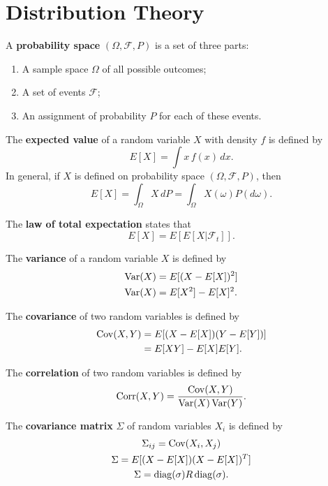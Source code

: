\section{Distribution Theory}

\begin{outline}
\1 A \textbf{probability space} $(\Omega, \mathscr{F}, P)$ is a set of three parts:
\begin{enumerate}
\item A sample space $\Omega$ of all possible outcomes;
\item A set of events $\mathscr{F}$;
\item An assignment of probability $P$ for each of these events.
\end{enumerate}

\1 The \textbf{expected value} of a random variable $X$ with density $f$ is defined by
\begin{equation*}
  E[X] = \int x\,f(x)\,dx.
\end{equation*}
In general, if $X$ is defined on probability space $(\Omega,\mathscr{F},P)$, then 
\begin{equation*}
  E[X] = \int_\Omega X\,dP = \int_\Omega X(\omega)P(d\omega).
\end{equation*}

\1 The \textbf{law of total expectation} states that
\begin{equation*}
  E[X] = E[E[X|\mathscr{F}_t]].
\end{equation*}

\1 The \textbf{variance} of a random variable $X$ is defined by
\begin{align*}
  \operatorname{Var}(X) &= E[(X-E[X])^2]\\
  \operatorname{Var}(X) &= E[X^2] - E[X]^2.
\end{align*}

\1 The \textbf{covariance} of two random variables is defined by
\begin{align*}
  \operatorname{Cov}(X,Y) &= E[(X-E[X])(Y-E[Y])]\\
            &= E[XY] - E[X]E[Y].
\end{align*}

\1 The \textbf{correlation} of two random variables is defined by
\begin{equation*}
  \operatorname{Corr}(X,Y) = \frac{\operatorname{Cov}(X,Y)}{\operatorname{Var}(X)\operatorname{Var}(Y)}.
\end{equation*}

\1 The \textbf{covariance matrix} $\Sigma$ of random variables $X_i$ is defined by
\begin{gather*}
  \Sigma_{ij} = \operatorname{Cov}(X_i,X_j)\\
  \Sigma = E[(X-E[X])(X-E[X])^T]\\
  \Sigma = \operatorname{diag}(\sigma)R\operatorname{diag}(\sigma).
\end{gather*}


\end{outline}
